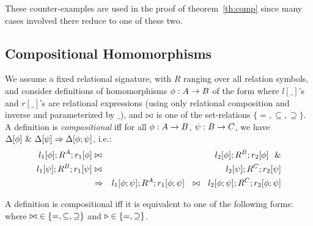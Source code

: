 \documentclass[10pt]{article}
\begin{document}
\noindent
These counter-examples are used in the proof of 
theorem~\ref{th:comp} since many cases involved there reduce to one of these two.


\subsection{Compositional Homomorphisms}
\label{sub:comp}
We assume a fixed relational signature, with $R$ ranging over all relation symbols, 
and consider definitions  of homomorphisms $\phi:A\rightarrow B$ of the form
where $l[\_]$'s and $r[\_]$'s are relational expressions
(using only relational composition
and inverse and parameterized by $\_$), and $\bowtie$ is one of the set-relations
$\{=,\subseteq,\supseteq\}$. A definition is {\em compositional} iff
for all $\phi:A\rightarrow B$, $\psi:B\rightarrow C$, we have 
$\Delta[\phi]\ \&\ \Delta[\psi]\Rightarrow \Delta[\phi;\psi]$, i.e.:
\begin{eqnarray}
l_1[\phi];R^A;r_1[\phi] & \any & l_2[\phi];R^B;r_2[\phi]\ \ \& \nonumber \\
l_1[\psi];R^B;r_1[\psi] & \any & l_2[\psi];R^C;r_2[\psi] \\
  & \impl & l_1[\phi;\psi];R^A;r_1[\phi;\psi]\ \ \any\ \
    l_2[\phi;\psi];R^C;r_2[\phi;\psi] \nonumber
\end{eqnarray}


\begin{Theorem}\label{th:comp}
A definition is compositional iff it is equivalent to one of the
following forms: 
where $\bowtie\ \in\{=,\subseteq,\supseteq\}$ and
$\triangleright\in\{=,\supseteq\}$.
\end{Theorem}
\end{document}
